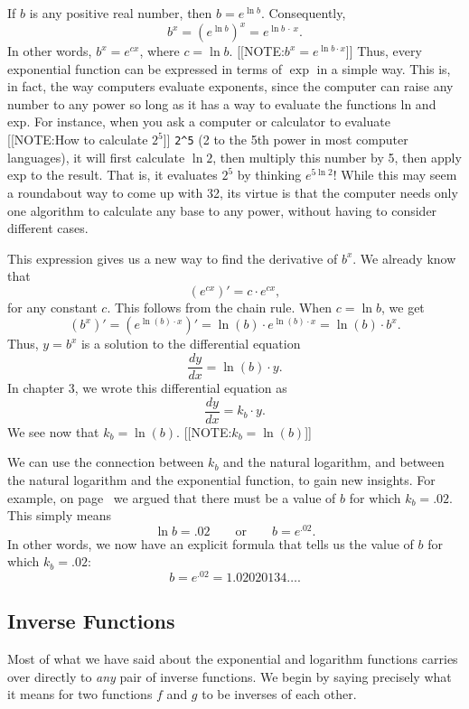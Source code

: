 If $b$ is any positive real number, then $b = e^{\ln{b}}$.  Consequently,
	\[
b^{x} = 
		\left(e^{\ln{b}}\right)^{x} =
		e^{\ln{b} \, \cdot \, x}.
\]
In other words, $b^{\displaystyle x} = e^{\displaystyle cx}$, where $c
= \ln{b}$.
[[NOTE:$b^{x} = e^{\ln{b} \cdot x}$]]
Thus, every exponential function can be expressed in terms of $\exp$
in a simple way.  This is, in fact, the way computers evaluate
exponents, since the computer can raise any number to any power so
long as it has a way to evaluate the functions ln and exp.  For
instance, when you ask a computer or calculator to evaluate
[[NOTE:How to calculate $2^5$]] 
\verb+2^5+ (2 to the 5th power in most computer languages), it will
first calculate $\ln{2}$, then multiply this number by 5, then apply
exp to the result.  That is, it evaluates $2^5$ by thinking
$e^{5\ln{2}}$!  While this may seem a roundabout way to come up with
32, its virtue is that the computer needs only one algorithm to
calculate any base to any power, without having to consider different
cases.

	This expression gives us a new way to find the derivative of $b^x$.  We already know that
	\[
( e^{\displaystyle cx})' = 
		c \cdot e^{\displaystyle cx},
\]
for any constant $c$.  This follows from the chain rule.  When $c = \ln{b}$, we get
	\[
(b^{\displaystyle x})' = 
		(e^{\displaystyle \ln(b) \cdot x})' = 
		\ln(b) \cdot e^{\displaystyle \ln(b) \cdot x} = 
		\ln(b) \cdot b^{\displaystyle x}.
\]
Thus, $y = b^{\displaystyle x}$ is a solution to the differential equation
	\[
\dfrac{dy}{dx} = \ln(b) \cdot y.
\]
In chapter 3, we wrote this differential equation as
	\[
\dfrac{dy}{dx} = k_b \cdot y.
\]
We see now that $k_b = \ln(b)$.  
	[[NOTE:$k_b = \ln(b)$]]


We can use the connection between $k_b$ and the natural logarithm, and
between the natural logarithm and the exponential function, to gain
new insights.  For example, on page~\pageref{k_b} we argued that there
must be a value of $b$ for which $k_b = .02$.  This simply means
\[
\ln{b} = .02 \qquad \mbox{or} \qquad b = e^{.02}.
\]
In other words, we now have an explicit formula that tells us the
value of $b$ for which $k_b = .02$:
\[
b = e^{.02} = 1.02020134\ldots .
\]


\subsection{Inverse Functions}
\label{subsec:inverse-functions}

	Most of what we have said about the exponential and logarithm functions carries over directly to {\em any\/} pair of inverse functions.  We begin by saying precisely what it means for two functions $f$ and $g$ to be inverses of each other.




